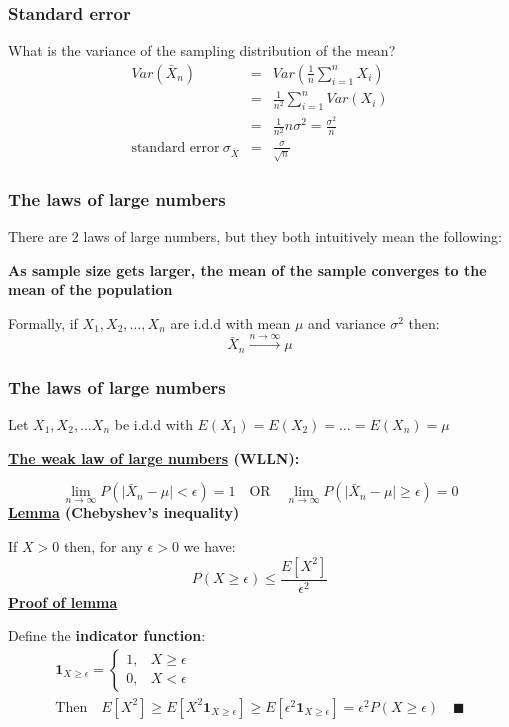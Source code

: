 \documentclass[t,8pt]{beamer}%
\begin{document}
\begin{frame}
	\frametitle{Standard error}
	What is the variance of the sampling distribution of the mean?
	\begin{eqnarray*}
		Var(\bar X_n)&=&Var\left(\frac 1n\sum_{i=1}^nX_i\right)\\
		&=&\frac 1{n^2}\sum_{i=1}^nVar(X_i)\\
		&=&\frac 1{n^2}n\sigma^2=\frac{\sigma^2}n\\
		\text{standard error}\ \sigma_{\bar X}&=&\frac{\sigma}{\sqrt{n}}
	\end{eqnarray*}
\end{frame}

\begin{frame}
	\frametitle{The laws of large numbers}
	There are $2$ laws of large numbers, but they both intuitively mean the following: \par
	{\bf As sample size gets larger, the mean of the sample converges to the mean of the population} \par
        Formally, if $X_1,X_2,\dots,X_n$ are i.d.d with mean $\mu$ and variance $\sigma^2$ then:
        $$\bar X_n\xrightarrow{\text{$n\rightarrow\infty$}}\mu$$
\end{frame}

\begin{frame}
	\frametitle{The laws of large numbers}
	Let $X_1,X_2,\dots X_n$ be i.d.d with $E(X_1)=E(X_2)=\dots=E(X_n)=\mu$ \par
	{\bf\underline{The weak law of large numbers} (WLLN):} \par
	$$\lim_{n\rightarrow\infty} P\left(\vert\bar X_n-\mu\vert<\epsilon\right)=1\quad\text{OR}\quad \lim_{n\rightarrow\infty}P\left(\vert\bar X_n-\mu\vert\geq\epsilon\right)=0$$
        {\bf\underline{Lemma} (Chebyshev's inequality)} \par
        If $X>0$ then, for any $\epsilon >0$ we have:
        $$P(X\geq\epsilon)\leq\frac{E[X^2]}{\epsilon^2}$$
        {\bf\underline{Proof of lemma}} \par
        Define the {\bf indicator function}:
        \begin{eqnarray*}
		\mathbf 1_{X\geq\epsilon} = \left\{\begin{array}{lr}
			1, & X\geq\epsilon\\
			0, & X<\epsilon
		\end{array}\right.\\
        \text{Then}\quad E[X^2]\geq E[X^2\mathbf 1_{X\geq\epsilon}]\geq E[\epsilon^2\mathbf 1_{X\geq\epsilon}]=\epsilon^2P(X\geq\epsilon)\quad\blacksquare
        \end{eqnarray*}
\end{frame}
\end{document}
